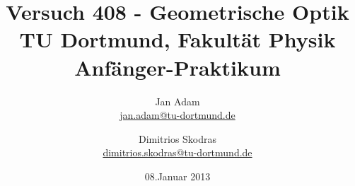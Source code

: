 


\usepackage{pgf,tikz}
\usetikzlibrary{arrows}

\title{Versuch 408 - Geometrische Optik\\				%
\large TU Dortmund, Fakultät Physik\\ 
\normalsize Anfänger-Praktikum}

\author{Jan Adam\\			%
{\small \href{jan.adam@tu-dortmund.de}{jan.adam@tu-dortmund.de}}	%
\and						%
Dimitrios Skodras\\					%
{\small \href{dimitrios.skodras@tu-dortmund.de}{dimitrios.skodras@tu-dortmund.de}}		%
}
\date{08.Januar 2013}				%





\maketitle					%
\thispagestyle{empty} 				%



\tableofcontents


\newpage					%


